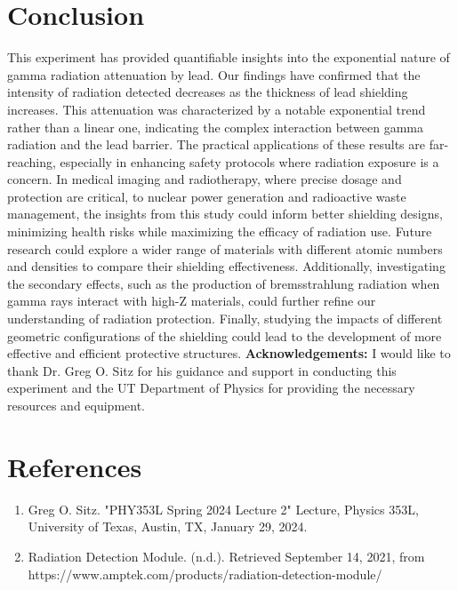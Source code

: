 \documentclass[12pt]{article}
\begin{document}
\section{Conclusion}
    This experiment has provided quantifiable insights into the exponential nature of gamma radiation attenuation by lead. 
    Our findings have confirmed that the intensity of radiation detected decreases as the thickness of lead shielding 
    increases. This attenuation was characterized by a notable exponential trend rather than a linear one, indicating 
    the complex interaction between gamma radiation and the lead barrier. The practical applications of these results 
    are far-reaching, especially in enhancing safety protocols where radiation exposure is a concern. In medical imaging 
    and radiotherapy, where precise dosage and protection are critical, to nuclear power generation and radioactive waste 
    management, the insights from this study could inform better shielding designs, minimizing health risks while 
    maximizing the efficacy of radiation use. Future research could explore a wider range of materials with different 
    atomic numbers and densities to compare their shielding effectiveness. Additionally, investigating the secondary 
    effects, such as the production of bremsstrahlung radiation when gamma rays interact with high-Z materials, could 
    further refine our understanding of radiation protection. Finally, studying the impacts of different geometric 
    configurations of the shielding could lead to the development of more effective and efficient protective structures.
        \textbf{Acknowledgements:} I would like to thank Dr. Greg O. Sitz for his guidance and support in conducting this experiment and the UT Department of Physics for providing the necessary resources and equipment.


\section{References}
    \begin{enumerate}
        \item Greg O. Sitz. "PHY353L Spring 2024 Lecture 2" Lecture, Physics 353L, University of Texas, Austin, TX, January 29, 2024.
        \item Radiation Detection Module. (n.d.). Retrieved September 14, 2021, from https://www.amptek.com/products/radiation-detection-module/
    \end{enumerate}
\end{document}
